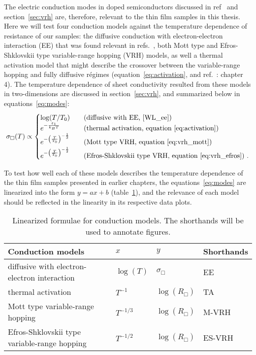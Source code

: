 The electric conduction modes in doped semiconductors discussed in ref~\cite{schklovskii_efros} and section~\ref{sec:vrh} are, therefore, relevant to the thin film samples in this thesis. Here we will test four conduction models against the temperature dependence of resistance of our samples: the diffusive conduction with electron-electron interaction (EE) that was found relevant in refs.~\cite{Chen2011, Liu2011, Roy2013, liao2015}, both Mott type and Efros-Shklovskii type variable-range hopping (VRH) models, as well a thermal activation model that might describe the crossover between the variable-range hopping and fully diffusive r\'egimes (equation~\ref{eq:activation}, and ref.~\cite{schklovskii_efros}: chapter 4). The temperature dependence of sheet conductivity resulted from these models in two-dimensions are discussed in section~\ref{sec:vrh}, and summarized below in equations~\ref{eq:modes}:%
\begin{equation}\label{eq:modes}
    \sigma_\Box(T) \propto %
    \begin{cases}
        \log(T / T_0)  & \quad \text{(diffusive with EE, \cite{WL_ee})}\\
        e^{-\frac{\varepsilon_1}{k_B T}}   & \quad \text{(thermal activation, equation~\ref{eq:activation})}\\
        e^{-\left(\frac{T}{T_0}\right)^{-\frac{1}{3}}}   & \quad \text{(Mott type VRH, equation~\ref{eq:vrh_mott})}\\
        e^{-\left(\frac{T}{T_0}\right)^{-\frac{1}{2}}} & \quad \text{(Efros-Shklovskii type VRH, equation~\ref{eq:vrh_efros})}~.
    \end{cases}
\end{equation}%

To test how well each of these models describes the temperature dependence of the thin film samples presented in earlier chapters, the equations~\ref{eq:modes} are linearized into the form $y=ax+b$ (table~\ref{tab:models}), and the relevance of each model should be reflected in the linearity in its respective data plots.%
\begin{table}[ht]
    \centering
    \begin{tabularx}{0.95\columnwidth}[t]{l|l|l|X}
    \caption[Linearized formulae for testing conduction models]{\label{tab:models}Linearized formulae for conduction models. The shorthands will be used to annotate figures.}\\
		\hline\hline
        Conduction models & $x$ & $y$ & Shorthands\\
        \hline%
        diffusive with electron-electron interaction & $\log(T)$ & $\sigma_\Box$ & EE\\
        thermal activation & $T^{-1}$ & $\log\left(R_\Box\right)$ & TA\\
        Mott type variable-range hopping & $T^{-1/3}$ & $\log\left(R_\Box\right)$ & M-VRH\\
        Efros-Shklovskii type variable-range hopping & $T^{-1/2}$ & $\log\left(R_\Box\right)$ & ES-VRH\\
		\hline\hline
    \end{tabularx}
\end{table} %

